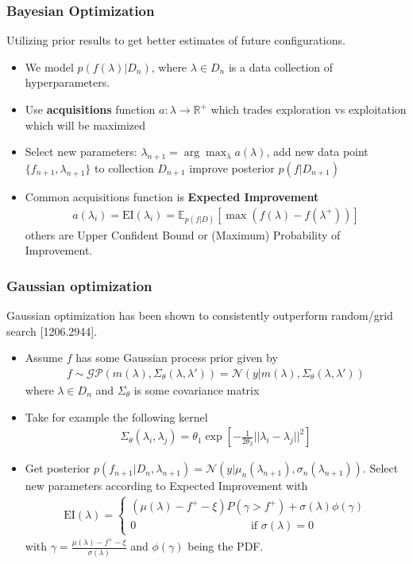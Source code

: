 \documentclass{beamer}
\newcommand{\bi}{\begin{itemize}}
\newcommand{\ei}{\end{itemize}}
\begin{document}
\begin{frame}
\frametitle{Bayesian Optimization}
Utilizing prior results to get better estimates of future configurations.
\bi
\item We model $p(f(\lambda)|D_n)$, where $\lambda \in D_n$ is a data collection of hyperparameters.
\item Use \textbf{acquisitions} function $a: \lambda \rightarrow \mathbb{R}^+$ which trades exploration vs exploitation which will be maximized
\pause
\item Select new parameters: $\lambda_{n+1} = \arg \max_\lambda a(\lambda)$, add new data point $\{f_{n+1}, \lambda_{n+1}\}$ to collection $D_{n+1}$ improve posterior $p(f|D_{n+1})$
\item Common acquisitions function is \textbf{Expected Improvement}
\begin{align}
	a(\lambda_i) = \text{EI}(\lambda_i) = \mathbb{E}_{p(f|D)} [\max( f(\lambda) - f(\lambda^+))]
\end{align}
others are Upper Confident Bound or (Maximum) Probability of Improvement.
\ei
\end{frame}

\begin{frame}
\frametitle{Gaussian optimization}
Gaussian optimization has been shown to consistently outperform random/grid search {\color{blue} [1206.2944]}.
\bi
\item Assume $f$ has some Gaussian process prior given by
\begin{align}
	f \sim \mathcal{GP}(m(\lambda), \Sigma_\theta (\lambda, \lambda') )=  \mathcal{N} (y|m(\lambda), \Sigma_\theta(\lambda, \lambda'))
\end{align}
where $\lambda \in D_n$ and $\Sigma_\theta$ is some covariance matrix%
\item Take for example the following kernel
\begin{align}
	\Sigma_\theta (\lambda_i, \lambda_j) = \theta_1 \exp \left[ - \frac{1}{2 \theta_2} ||\lambda_i - \lambda_j ||^2 \right]
\end{align}
\pause
\item Get posterior $p(f_{n+1}|D_n, \lambda_{n+1}) = \mathcal{N}(y|\mu_n(\lambda_{n+1}), \sigma_n(\lambda_{n+1}))$. Select new parameters according to Expected Improvement with
\begin{align}
	\text{EI}(\lambda) = \begin{cases}
	(\mu(\lambda) - f^+  - \xi) P(\gamma > f^+ ) + \sigma (\lambda) \phi(\gamma)  \\
	0 \qquad \qquad \qquad \qquad \qquad \text{ if } \sigma(\lambda) = 0
	\end{cases}
\end{align}
with $\gamma = \frac{\mu(\lambda) - f^+ - \xi}{\sigma(\lambda)}$ and $\phi(\gamma)$ being the PDF.

\ei
\end{frame}
\end{document}
